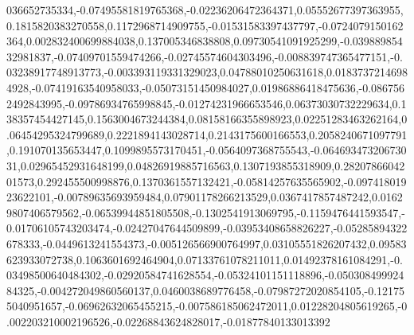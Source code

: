 036652735334,-0.07495581819765368,-0.02236206472364371,0.05552677397363955,0.1815820383270558,0.1172968714909755,-0.01531583397437797,-0.0724079150162364,0.002832400699884038,0.137005346838808,0.09730541091925299,-0.03988985432981837,-0.07409701559474266,-0.02745574604303496,-0.008839747365477151,-0.03238917748913773,-0.003393119331329023,0.04788010250631618,0.01837372146984928,-0.07419163540958033,-0.05073151450984027,0.01986886418475636,-0.0867562492843995,-0.09786934765998845,-0.01274231966653546,0.06373030732229634,0.138357454427145,0.1563004673244384,0.08158166355898923,0.02251283463262164,0.06454295324799689,0.2221894143028714,0.2143175600166553,0.2058240671097791,0.191070135653447,0.1099895573170451,-0.0564097368755543,-0.06469347320673031,0.02965452931648199,0.04826919885716563,0.1307193855318909,0.2820786604201573,0.292455500998876,0.1370361557132421,-0.05814257635565902,-0.09741801923622101,-0.00789635693959484,0.07901178266213529,0.0367417857487242,0.01629807406579562,-0.06539944851805508,-0.1302541913069795,-0.1159476441593547,-0.01706105743203474,-0.02427047644509899,-0.03953408658826227,-0.05285894322678333,-0.0449613241554373,-0.005126566900764997,0.03105551826207432,0.09583623933072738,0.1063601692464904,0.07133761078211011,0.01492378161084291,-0.03498500640484302,-0.02920584741628554,-0.05324101151118896,-0.05030849992484325,-0.004272049860560137,0.0460038689776458,-0.07987272020854105,-0.121755040951657,-0.06962632065455215,-0.007586185062472011,0.01228204805619265,-0.002203210002196526,-0.02268843624828017,-0.01877840133013392
